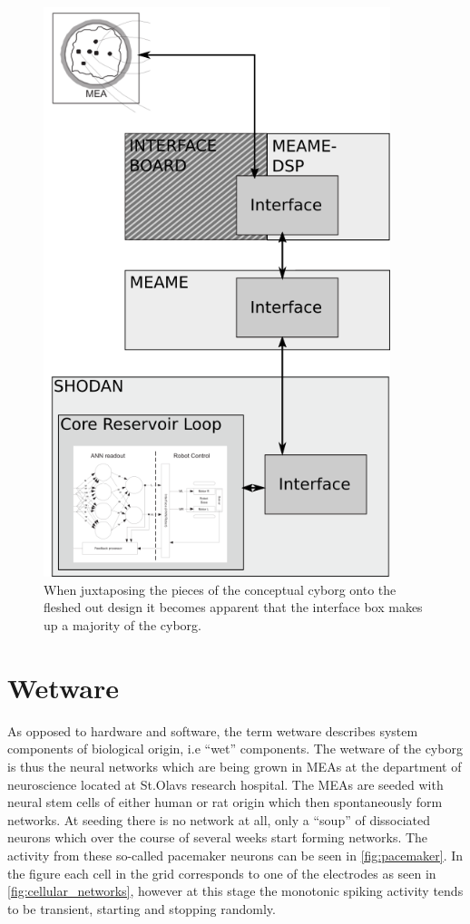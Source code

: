 \begin{figure}[h]
  \centering
  \includegraphics[width=0.9\textwidth]{fig/ConceptMap.png}
  \caption{
    When juxtaposing the pieces of the conceptual cyborg onto the fleshed out
    design it becomes apparent that the interface box makes up a majority of the cyborg.
  }
  \label{figJuxta}
\end{figure}
\section{Wetware}
As opposed to hardware and software, the term wetware describes system
components of biological origin, i.e ``wet'' components.
The wetware of the cyborg is thus the neural networks which are being grown in
MEAs at the department of neuroscience located at St.Olavs research hospital.
The MEAs are seeded with neural stem cells of either human or rat origin which
then spontaneously form networks.
At seeding there is no network at all, only a ``soup'' of dissociated
neurons which over the course of several weeks start forming networks.
The activity from these so-called pacemaker neurons can be seen in
\ref{fig:pacemaker}.
In the figure each cell in the grid corresponds to one of the
electrodes as seen in \ref{fig:cellular_networks}, however at this stage the
monotonic spiking activity tends to be transient, starting and stopping
randomly.
